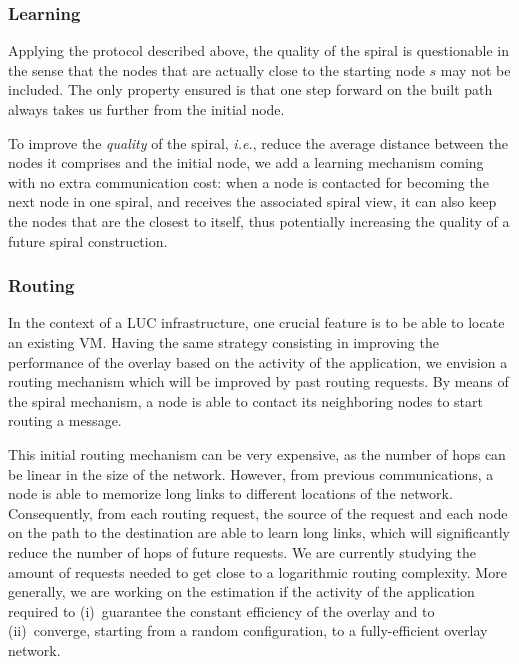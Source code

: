 \vspace*{-.4cm}
\subsubsection*{Learning}
\vspace*{-.2cm}

Applying the protocol described above, the quality of the spiral is
questionable in the sense that the nodes that are actually close to the starting
node $s$ may not be included. The only property ensured is that one step
forward on the built path always takes us further from the initial node.

To improve the \emph{quality} of the spiral, \emph{i.e.}, reduce the average
distance between the nodes it comprises and the initial node, we add a learning
mechanism coming with no extra communication cost: when a node is contacted for
becoming the next node in one spiral, and receives the associated spiral view,
it can also keep the nodes that are the closest to itself, thus potentially
increasing the quality of a future spiral construction.

\vspace*{-.4cm}
\subsubsection*{Routing}
\vspace*{-.2cm}

In the context of a LUC infrastructure, one crucial feature is to be able to
locate an existing VM. Having the same strategy consisting in improving the
performance of the overlay based on the activity of the application, we envision a
routing mechanism which will be improved by past routing requests. By means of the
spiral mechanism, a node is able to contact its neighboring
nodes to start routing a message.

This initial routing mechanism can be very expensive, as the number of hops can
be linear in the size of the network. However, from previous communications, a
node is able to memorize long links to different locations of the
network. Consequently, from each routing request, the source of the request and
each node on the path to the destination are able to learn long links, which
will significantly reduce the number of hops of future requests. We are
currently studying the amount of requests needed to get close to a logarithmic
routing complexity. More generally, we are working on the estimation if the
activity of the application required to (i)~guarantee the constant efficiency of
the overlay and to (ii)~converge, starting from a random configuration, to a
fully-efficient overlay network.

